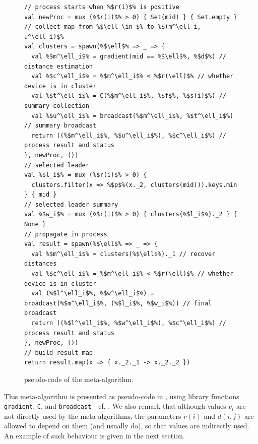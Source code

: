 \begin{figure}
\begin{lstlisting}[escapechar=\%]
// process starts when %$r(i)$% is positive
val newProc = mux (%$r(i)$% > 0) { Set(mid) } { Set.empty }
// collect map from %$\ell \in $% to %$(m^\ell_i, u^\ell_i)$%
val clusters = spawn(%$\ell$% => _ => {
  val %$m^\ell_i$% = gradient(mid == %$\ell$%, %$d$%) // distance estimation
  val %$c^\ell_i$% = %$m^\ell_i$% < %$r(\ell)$% // whether device is in cluster
  val %$t^\ell_i$% = C(%$m^\ell_i$%, %$f$%, %$s(i)$%) // summary collection
  val %$u^\ell_i$% = broadcast(%$m^\ell_i$%, %$t^\ell_i$%) // summary broadcast
  return ((%$m^\ell_i$%, %$u^\ell_i$%), %$c^\ell_i$%) // process result and status
}, newProc, ())
// selected leader
val %$l_i$% = mux (%$r(i)$% > 0) {
  clusters.filter(x => %$p$%(x._2, clusters(mid))).keys.min
} { mid }
// selected leader summary
val %$w_i$% = mux (%$r(i)$% > 0) { clusters(%$l_i$%)._2 } { None }
// propagate in process
val result = spawn(%$\ell$% => _ => {
  val %$m^\ell_i$% = clusters(%$\ell$%)._1 // recover distances
  val %$c^\ell_i$% = %$m^\ell_i$% < %$r(\ell)$% // whether device is in cluster
  val (%$l^\ell_i$%, %$w^\ell_i$%) = broadcast(%$m^\ell_i$%, (%$l_i$%, %$w_i$%)) // final broadcast
  return ((%$l^\ell_i$%, %$w^\ell_i$%), %$c^\ell_i$%) // process result and status
}, newProc, ())
// build result map
return result.map(x => { x._2._1 -> x._2._2 })
\end{lstlisting}
\caption[\scafi{} pseudo-code of the clustering meta-algorithm.]{\scafi{} pseudo-code of the meta-algorithm.} \label{fig:pseudocode}
\end{figure}

This meta-algorithm is presented as \scafi{} pseudo-code in , using \scafi{} library functions \lstinline|gradient|, \lstinline|C|, and \lstinline|broadcast|---cf. .
%
%
 We also remark that although values $v_i$ are not directly used by the meta-algorithms, the parameters $r(i)$ and $d(i,j)$ are allowed to depend on them (and usually do),
 so that values are indirectly used. An example of such behaviour is given in the next section.

